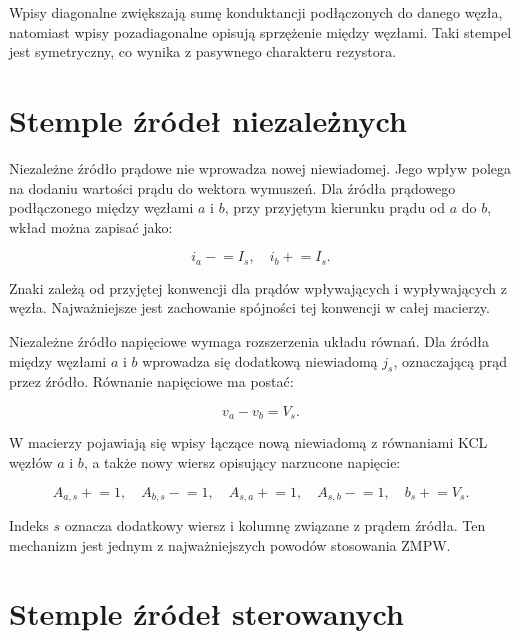 Wpisy diagonalne zwiększają sumę konduktancji podłączonych do danego węzła, natomiast wpisy pozadiagonalne opisują sprzężenie między węzłami. Taki stempel jest symetryczny, co wynika z pasywnego charakteru rezystora.

\section{Stemple źródeł niezależnych}
\label{sec:stemple-zrodel-niezaleznych}

Niezależne źródło prądowe nie wprowadza nowej niewiadomej. Jego wpływ polega na dodaniu wartości prądu do wektora wymuszeń. Dla źródła prądowego podłączonego między węzłami \(a\) i \(b\), przy przyjętym kierunku prądu od \(a\) do \(b\), wkład można zapisać jako:

\begin{equation}
\label{eq:stamp-current-source}
i_a \mathrel{-}= I_s,\quad
i_b \mathrel{+}= I_s.
\end{equation}

Znaki zależą od przyjętej konwencji dla prądów wpływających i wypływających z węzła. Najważniejsze jest zachowanie spójności tej konwencji w całej macierzy.

Niezależne źródło napięciowe wymaga rozszerzenia układu równań. Dla źródła między węzłami \(a\) i \(b\) wprowadza się dodatkową niewiadomą \(j_s\), oznaczającą prąd przez źródło. Równanie napięciowe ma postać:

\begin{equation}
\label{eq:stamp-voltage-source-equation}
v_a - v_b = V_s.
\end{equation}

W macierzy pojawiają się wpisy łączące nową niewiadomą z równaniami KCL węzłów \(a\) i \(b\), a także nowy wiersz opisujący narzucone napięcie:

\begin{equation}
\label{eq:stamp-voltage-source}
A_{a,s} \mathrel{+}= 1,\quad
A_{b,s} \mathrel{-}= 1,\quad
A_{s,a} \mathrel{+}= 1,\quad
A_{s,b} \mathrel{-}= 1,\quad
b_s \mathrel{+}= V_s.
\end{equation}

Indeks \(s\) oznacza dodatkowy wiersz i kolumnę związane z prądem źródła. Ten mechanizm jest jednym z najważniejszych powodów stosowania ZMPW.

\section{Stemple źródeł sterowanych}
\label{sec:stemple-zrodel-sterowanych}

